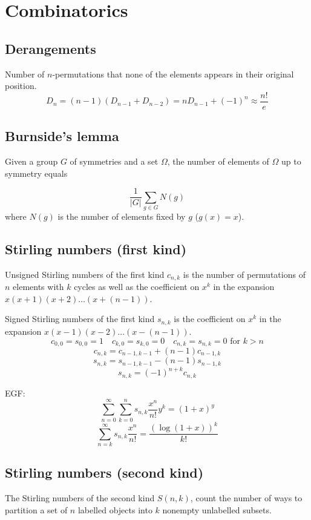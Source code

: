 \chapter{Combinatorics}

\section{Derangements}
Number of $n$-permutations that none of the elements appears in their original position.
$$D_n = (n - 1)(D_{n - 1} + D_{n - 2}) = nD_{n - 1} + (-1)^n \approx \frac{n!}{e}$$




\section{Burnside's lemma}
Given a group $G$ of symmetries and a set $\Omega$, the number of elements of $\Omega$ up to symmetry equals

$$\frac{1}{|G|} \sum_{g \in G} N(g)$$
where $N(g)$ is the number of elements fixed by $g$ ($g(x) = x$).





\section{Stirling numbers (first kind)}
Unsigned Stirling numbers of the first kind $c_{n, k}$ is the number of permutations of $n$ elements with $k$ cycles as well as the coefficient on $x^k$ in the expansion $x(x + 1)(x + 2)\dots(x + (n - 1))$.


Signed Stirling numbers of the first kind $s_{n, k}$ is the coefficient on $x^k$ in the expansion $x(x - 1)(x - 2)\dots(x - (n - 1))$.
$$c_{0, 0} = s_{0, 0} = 1 \quad c_{k, 0} = s_{k, 0} = 0 \quad c_{n, k} = s_{n, k} = 0 \text{ for } k > n$$
$$c_{n, k} = c_{n - 1, k - 1} + (n - 1)c_{n - 1, k}$$
$$s_{n, k} = s_{n - 1, k - 1} - (n - 1)s_{n - 1, k}$$
$$s_{n, k} = (-1)^{n + k}c_{n, k}$$

EGF:
$$\sum_{n = 0}^{\infty}\sum_{k = 0}^{n}s_{n, k}\frac{x^n}{n!}y^k = (1 + x)^y$$
$$\sum_{n = k}^{\infty}s_{n, k}\frac{x^n}{n!} = \frac{(\log(1 + x))^k}{k!}$$




\section{Stirling numbers (second kind)}
The Stirling numbers of the second kind $S(n, k)$, count the number of ways to partition a set of $n$ labelled objects into $k$ nonempty unlabelled subsets.

